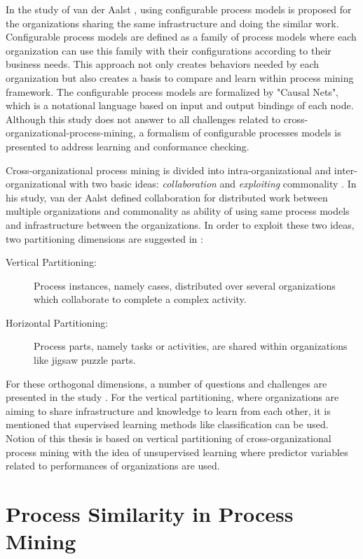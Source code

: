In the study of van der Aalst \cite{van2011business}, using configurable process models is proposed for the organizations sharing the same infrastructure and doing the similar work. Configurable process models are defined as a family of process models where each organization can use this family with their configurations according to their business needs. This approach not only creates behaviors needed by each organization but also creates a basis to compare and learn within process mining framework. The configurable process models are formalized by "Causal Nets", which is a notational language based on input and output bindings of each node. Although this study does not answer to all challenges related to cross-organizational-process-mining, a formalism of configurable processes models is presented to address learning and conformance checking.

Cross-organizational process mining is divided into intra-organizational and inter-organizational with two basic ideas: \textit{collaboration} and \textit{exploiting} commonality \cite{van2011intra}. In his study, van der Aalst defined collaboration for distributed work between multiple organizations and commonality as ability of using same process models and infrastructure between the organizations. In order to exploit these two ideas, two partitioning dimensions are suggested in \cite{van2011intra}:
\begin{description}
	\item[Vertical Partitioning:] Process instances, namely cases, distributed over several organizations which collaborate to complete a complex activity. 
	\item[Horizontal Partitioning:] Process parts, namely tasks or activities, are shared within organizations like jigsaw puzzle parts.
\end{description}
For these orthogonal dimensions, a number of questions and challenges are presented in the study  \cite{van2011intra}. For the vertical partitioning, where organizations are aiming to share infrastructure and knowledge to learn from each other, it is mentioned that supervised learning methods like classification can be used. Notion of this thesis is based on vertical partitioning of cross-organizational process mining with the idea of unsupervised learning where predictor variables related to performances of organizations are used.
 
\section{Process Similarity in Process Mining}
\label{sec:process-similarity-in-process-mining}

